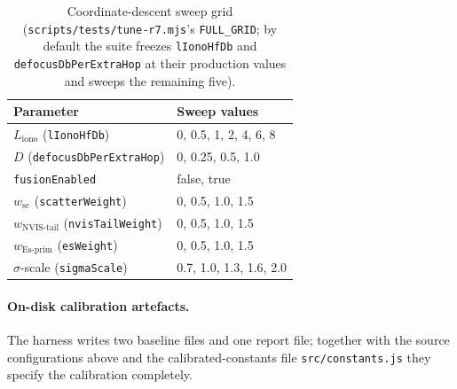 \documentclass[11pt,a4paper]{article}
\begin{document}
\begin{table}[H]
\centering
\small
\caption{Coordinate-descent sweep grid
(\texttt{scripts/tests/tune-r7.mjs}'s \texttt{FULL\_GRID}; by
default the suite freezes \texttt{lIonoHfDb} and
\texttt{defocusDbPerExtraHop} at their production values and
sweeps the remaining five).}
\label{tab:tunegrid}
\begin{tabular}{@{}ll@{}}
\toprule
\textbf{Parameter} & \textbf{Sweep values} \\
\midrule
$L_{\text{iono}}$ (\texttt{lIonoHfDb})           & 0, 0.5, 1, 2, 4, 6, 8 \\
$D$ (\texttt{defocusDbPerExtraHop})              & 0, 0.25, 0.5, 1.0 \\
\texttt{fusionEnabled}                            & false, true \\
$w_{\text{sc}}$ (\texttt{scatterWeight})          & 0, 0.5, 1.0, 1.5 \\
$w_{\text{NVIS-tail}}$ (\texttt{nvisTailWeight}) & 0, 0.5, 1.0, 1.5 \\
$w_{\text{Es-prim}}$ (\texttt{esWeight})          & 0, 0.5, 1.0, 1.5 \\
$\sigma$-scale (\texttt{sigmaScale})              & 0.7, 1.0, 1.3, 1.6, 2.0 \\
\bottomrule
\end{tabular}
\end{table}

\paragraph{On-disk calibration artefacts.}  The harness writes
two baseline files and one report file; together with the source
configurations above and the calibrated-constants file
\texttt{src/constants.js} they specify the calibration completely.
\end{document}
